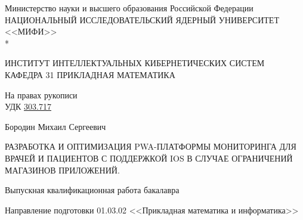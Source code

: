 
\begin{titlepage}
    \begin{center}
        Министерство науки и высшего образования Российской Федерации \\
        НАЦИОНАЛЬНЫЙ ИССЛЕДОВАТЕЛЬСКИЙ ЯДЕРНЫЙ УНИВЕРСИТЕТ <<МИФИ>> \\*
        \hrulefill
    \end{center}

    \begin{center}
        ИНСТИТУТ ИНТЕЛЛЕКТУАЛЬНЫХ КИБЕРНЕТИЧЕСКИХ СИСТЕМ\\
        КАФЕДРА \textnumero{}31 ПРИКЛАДНАЯ МАТЕМАТИКА
    \end{center}
    \vspace{1cm}

    \begin{flushright}
        На правах рукописи\\
        УДК \underline{303.717}
    \end{flushright}

    \vspace{0.5em}

    \begin{center}
        Бородин Михаил Сергеевич
    \end{center}

    \vspace{1em}

    \begin{center}
        \large РАЗРАБОТКА И ОПТИМИЗАЦИЯ PWA-ПЛАТФОРМЫ МОНИТОРИНГА ДЛЯ ВРАЧЕЙ И ПАЦИЕНТОВ С ПОДДЕРЖКОЙ IOS В СЛУЧАЕ ОГРАНИЧЕНИЙ МАГАЗИНОВ ПРИЛОЖЕНИЙ.
    \end{center}

    \vspace{2em}

    \begin{center}
        \large{Выпускная квалификационная работа бакалавра}
    \end{center}

    \vspace{1em}

    \begin{center}
        Направление подготовки 01.03.02 <<Прикладная математика и информатика>>
    \end{center}

    \vspace{2.5em}


\end{titlepage}
